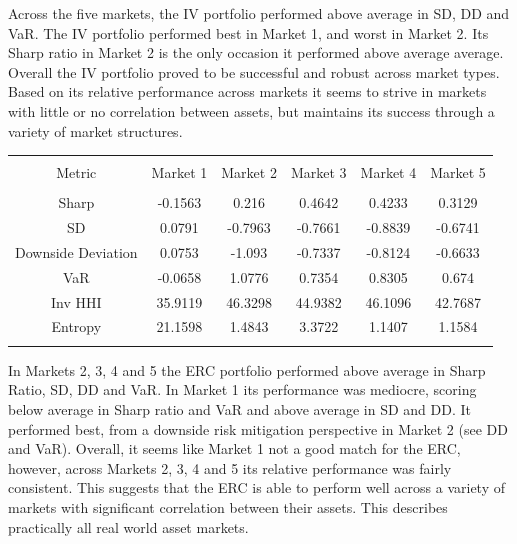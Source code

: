 \documentclass[11pt,preprint, authoryear]{elsarticle}
\let\origtable\table
\let\endorigtable\endtable
\renewenvironment{table}[1][2] {
    \expandafter\origtable\expandafter[H]
} {
    \endorigtable
}
\numberwithin{equation}{section}
\numberwithin{figure}{section}
\numberwithin{table}{section}
\begin{document}
Across the five markets, the IV portfolio performed above average in SD,
DD and VaR. The IV portfolio performed best in Market 1, and worst in
Market 2. Its Sharp ratio in Market 2 is the only occasion it performed
above average average. Overall the IV portfolio proved to be successful
and robust across market types. Based on its relative performance across
markets it seems to strive in markets with little or no correlation
between assets, but maintains its success through a variety of market
structures.

\begin{table}[!htbp] \centering 
  \caption{Equal Risk Contribution} 
  \label{erc} 
\begin{tabular}{@{\extracolsep{5pt}} cccccc} 
\\[-1.8ex]\hline 
\hline \\[-1.8ex] 
Metric & Market 1 & Market 2 & Market 3 & Market 4 & Market 5 \\ 
\hline \\[-1.8ex] 
Sharp & -0.1563 & 0.216 & 0.4642 & 0.4233 & 0.3129 \\ 
SD & 0.0791 & -0.7963 & -0.7661 & -0.8839 & -0.6741 \\ 
Downside Deviation & 0.0753 & -1.093 & -0.7337 & -0.8124 & -0.6633 \\ 
VaR & -0.0658 & 1.0776 & 0.7354 & 0.8305 & 0.674 \\ 
Inv HHI & 35.9119 & 46.3298 & 44.9382 & 46.1096 & 42.7687 \\ 
Entropy & 21.1598 & 1.4843 & 3.3722 & 1.1407 & 1.1584 \\ 
\hline \\[-1.8ex] 
\end{tabular} 
\end{table}

In Markets 2, 3, 4 and 5 the ERC portfolio performed above average in
Sharp Ratio, SD, DD and VaR. In Market 1 its performance was mediocre,
scoring below average in Sharp ratio and VaR and above average in SD and
DD. It performed best, from a downside risk mitigation perspective in
Market 2 (see DD and VaR). Overall, it seems like Market 1 not a good
match for the ERC, however, across Markets 2, 3, 4 and 5 its relative
performance was fairly consistent. This suggests that the ERC is able to
perform well across a variety of markets with significant correlation
between their assets. This describes practically all real world asset
markets.
\end{document}
